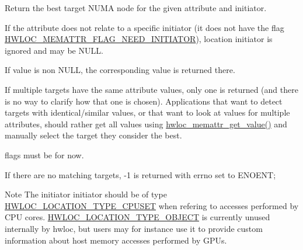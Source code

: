 Return the best target N\+U\+MA node for the given attribute and initiator. 

If the attribute does not relate to a specific initiator (it does not have the flag \hyperlink{a00212_gga78aceb4cac4d614c0f5e82dbfeb779e5a9d16523e285b2e22cfc78cc84dce8c96}{H\+W\+L\+O\+C\+\_\+\+M\+E\+M\+A\+T\+T\+R\+\_\+\+F\+L\+A\+G\+\_\+\+N\+E\+E\+D\+\_\+\+I\+N\+I\+T\+I\+A\+T\+OR}), location {\ttfamily initiator} is ignored and may be {\ttfamily N\+U\+LL}.

If {\ttfamily value} is non {\ttfamily N\+U\+LL}, the corresponding value is returned there.

If multiple targets have the same attribute values, only one is returned (and there is no way to clarify how that one is chosen). Applications that want to detect targets with identical/similar values, or that want to look at values for multiple attributes, should rather get all values using \hyperlink{a00211_ga297e4a9adc2272446a4c7449dacef0df}{hwloc\+\_\+memattr\+\_\+get\+\_\+value()} and manually select the target they consider the best.

{\ttfamily flags} must be {} for now.

If there are no matching targets, {\ttfamily -\/1} is returned with {\ttfamily errno} set to {\ttfamily E\+N\+O\+E\+NT};

\begin{DoxyNote}{Note}
The initiator {\ttfamily initiator} should be of type \hyperlink{a00211_gga33099ba58f607fc70925da3777688586a7135318a86361ad75fd1648e6bf6d174}{H\+W\+L\+O\+C\+\_\+\+L\+O\+C\+A\+T\+I\+O\+N\+\_\+\+T\+Y\+P\+E\+\_\+\+C\+P\+U\+S\+ET} when refering to accesses performed by C\+PU cores. \hyperlink{a00211_gga33099ba58f607fc70925da3777688586af637c39b23d48cff15ddb008644aaa84}{H\+W\+L\+O\+C\+\_\+\+L\+O\+C\+A\+T\+I\+O\+N\+\_\+\+T\+Y\+P\+E\+\_\+\+O\+B\+J\+E\+CT} is currently unused internally by hwloc, but users may for instance use it to provide custom information about host memory accesses performed by G\+P\+Us. 
\end{DoxyNote}
\mbox{\label{a00211_ga79f44f8e1cfd2f97a19171417a75a137}} 

